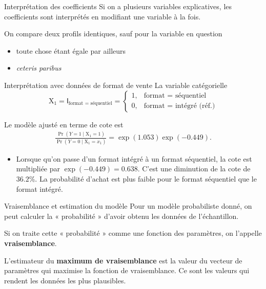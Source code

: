 \documentclass[
  ignorenonframetext,
]{beamer}
\providecommand{\tightlist}{%
  \setlength{\itemsep}{0pt}\setlength{\parskip}{0pt}}
\begin{document}
\begin{frame}{Interprétation des coefficients}
\protect{}\label{interpruxe9tation-des-coefficients}
Si on a plusieurs variables explicatives, les coefficients sont
interprétés en modifiant une variable à la fois.

On compare deux profils identiques, sauf pour la variable en question

\begin{itemize}
\tightlist
\item
  toute chose étant égale par ailleurs
\item
  \emph{ceteris paribus}
\end{itemize}
\end{frame}

\begin{frame}{Interprétation avec données de format de vente}
\protect{}\label{interpruxe9tation-avec-donnuxe9es-de-format-de-vente}
La variable catégorielle
\[\mathrm{X}_1 = \mathsf{I}_{\text{format = séquentiel}}= \begin{cases} 1, & \text{format = séquentiel} \\ 0, & \text{format = intégré (réf.)}\end{cases}\]

Le modèle ajusté en terme de cote est \begin{align*}
 \frac{\Pr(Y=1 \mid \mathrm{X}_1=1)}{\Pr(Y=0 \mid \mathrm{X}_1=x_1)} = \exp(1.053)\exp(-0.449).
\end{align*}

\small

\begin{itemize}
\tightlist
\item
  Lorsque qu'on passe d'un format intégré à un format séquentiel, la
  cote est multipliée par \(\exp(-0.449) = 0.638.\) C'est une diminution
  de la cote de \(36.2\)\%. La probabilité d'achat est plus faible pour
  le format séquentiel que le format intégré.
\end{itemize}
\end{frame}

\begin{frame}{Vraisemblance et estimation du modèle}
\protect{}\label{vraisemblance-et-estimation-du-moduxe8le}
Pour un modèle probabiliste donné, on peut calculer la « probabilité »
d'avoir obtenu les données de l'échantillon.

Si on traite cette « probabilité » comme une fonction des paramètres, on
l'appelle \textbf{vraisemblance}.

L'estimateur du \textbf{maximum de vraisemblance} est la valeur du
vecteur de paramètres qui maximise la fonction de vraisemblance. Ce sont
les valeurs qui rendent les données les plus plausibles.
\end{frame}
\end{document}
